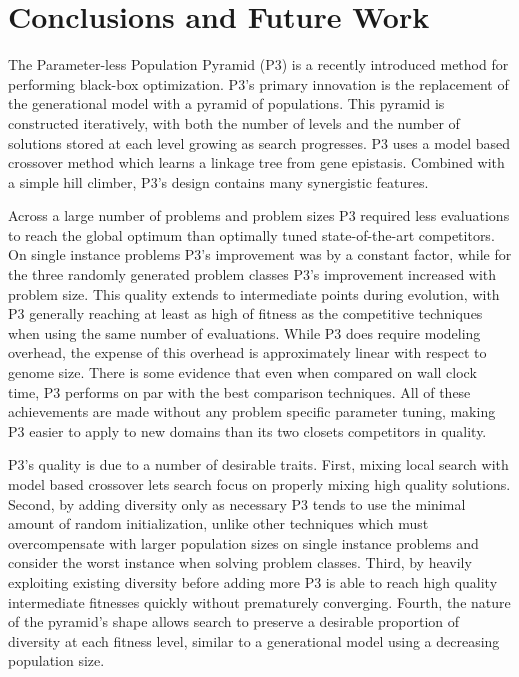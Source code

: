 \chapter{Conclusions and Future Work}
The Parameter-less Population Pyramid (P3) is a recently introduced method for performing black-box
optimization. P3's primary innovation is the replacement of the generational model with a pyramid of populations.
This pyramid is constructed iteratively, with both the number of levels and the number of solutions stored
at each level growing as search progresses. P3 uses a model based crossover method
which learns a linkage tree from gene epistasis. Combined with a simple hill climber, P3's design contains
many synergistic features.

Across a large number of problems and problem sizes P3 required less evaluations to reach the global optimum
than optimally tuned state-of-the-art competitors. On single instance problems P3's improvement was by a
constant factor, while for the three randomly generated problem classes P3's improvement increased with problem size. This
quality extends to intermediate points during evolution, with P3 generally reaching at least as high
of fitness as the competitive techniques when using the same number of evaluations. While P3 does require
modeling overhead, the expense of this overhead is approximately linear with respect to genome size. There
is some evidence that even when compared on wall clock time, P3 performs on par with
the best comparison techniques. All of these achievements are made without any problem specific parameter
tuning, making P3 easier to apply to new domains than its two closets competitors in quality.

P3's quality is due to a number of desirable traits. First, mixing local search with model based
crossover lets search focus on properly mixing high quality solutions. Second, by adding diversity only
as necessary P3 tends to use the minimal amount of random initialization, unlike other techniques which must
overcompensate with larger population sizes on single instance problems and consider the worst instance
when solving problem classes. Third, by heavily exploiting existing diversity before adding more P3 is able
to reach high quality intermediate fitnesses quickly without prematurely converging. Fourth, the
nature of the pyramid's shape allows search to preserve a desirable proportion of diversity at
each fitness level, similar to a generational model using a decreasing population size.

